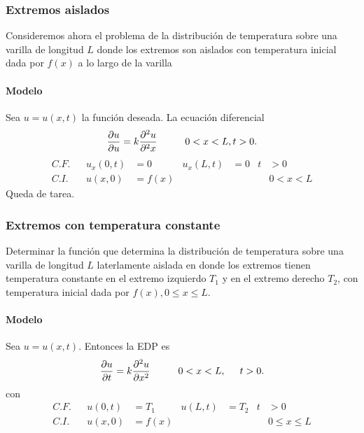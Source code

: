 \documentclass[11pt,letterpaper,draft]{report}
\newcommand\<{\langle}
\renewcommand\>{\rangle}
\begin{document}
\subsubsection{Extremos aislados}
Consideremos ahora el problema de la distribución de temperatura
sobre una varilla de longitud $L$ donde los extremos son aislados
con temperatura inicial dada por $f(x)$ a lo largo de la varilla

\paragraph{Modelo}
Sea $u=u(x,t)$ la función deseada. La ecuación diferencial
\[
  \frac{\partial u}{\partial u}
  =k
  \frac{\partial^2u}{\partial^2x}
  \hspace{10mm} 0<x<L, t>0
.\]
\begin{align*}
  C.F. && u_x(0,t) &= 0 & u_x(L,t) &= 0 &t&>0 \\
  C.I. && u(x,0) &= f(x) & &&& 0<x<L
\end{align*}
Queda de tarea.

\subsubsection{Extremos con temperatura constante}

Determinar la función que determina la distribución de
temperatura sobre una varilla de longitud $L$ laterlamente
aislada en donde los extremos tienen temperatura constante en el
extremo izquierdo $T_1$ y en el extremo derecho $T_2$, con
temperatura inicial dada por $f(x), 0\leq x\leq L$.

\paragraph{Modelo}
Sea $u=u(x,t)$. Entonces la EDP es
\[
  \frac{\partial u}{\partial t}
  = k
  \frac{\partial ^2 u}{\partial x^2}
  \hspace{10mm} 0<x<L,
  \hspace{5mm} t>0.
\]
con
\begin{align*}
  C.F. && u(0,t) &= T_1 & u(L,t) &= T_2 &t&>0 \\
  C.I. && u(x,0) &= f(x) & &&& 0\leq x\leq L
\end{align*}
\end{document}
